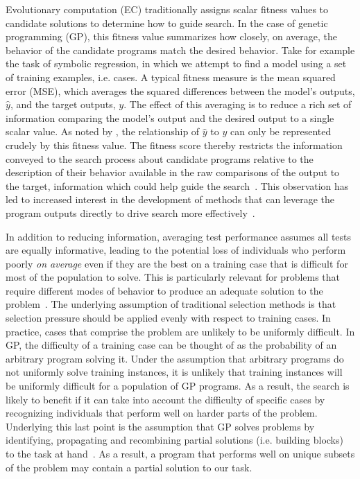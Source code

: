 \documentclass[twoside]{article}
\newcommand{\edit}[1]{{\color{red} #1}}
\begin{document}
Evolutionary computation (EC) traditionally assigns scalar fitness values to candidate solutions to determine how to guide search. In the case of genetic programming (GP), this fitness value summarizes how closely, on average, the behavior of the candidate programs match the desired behavior. Take for example the task of symbolic regression, in which we attempt to find a model using a set of training examples, i.e. cases. A typical fitness measure is the mean squared error (MSE), which averages the squared differences between the model's outputs, $\hat{y}$, and the target outputs, $y$. The effect of this averaging is to reduce a rich set of information comparing the model's output and the desired output to a single scalar value. As noted by \cite{krawiec_behavioral_2016}, the relationship of $\hat{y}$ to $y$ can only be represented crudely by this fitness value. The fitness score thereby restricts the information conveyed to the search process about candidate programs relative to the description of their behavior available in the raw comparisons of the output to the target, information which could help guide the search~\citep{krawiec_behavioral_2014, krawiec_automatic_2015}. This observation has led to increased interest in the development of methods that can leverage the program outputs directly to drive search more effectively~\citep{vanneschi_survey_2014}.

In addition to reducing information, averaging test performance assumes all tests are equally informative, leading to the potential loss of individuals who perform poorly {\it on average} even if they are the best on a training case that is difficult for most of the population to solve. This is particularly relevant for problems that require different modes of behavior to produce an adequate solution to the problem~\citep{spector_assessment_2012}. The underlying assumption of traditional selection methods is that selection pressure should be applied evenly with respect to training cases. In practice, cases that comprise the problem are unlikely to be uniformly difficult. \edit{In GP, the difficulty of a training case can be thought of as the probability of an arbitrary program solving it. Under the assumption that arbitrary programs do not uniformly solve training instances, it is unlikely that training instances will be uniformly difficult for a population of GP programs}. As a result, the search is likely to benefit if it can take into account the difficulty of specific cases by recognizing individuals that perform well on harder parts of the problem. Underlying this last point is the assumption that GP solves problems by identifying, propagating and recombining partial solutions (i.e. building blocks) to the task at hand~\citep{poli_schema_1998}. As a result, a program that performs well on unique subsets of the problem may \edit{contain} a partial solution to our task. 
\end{document}
